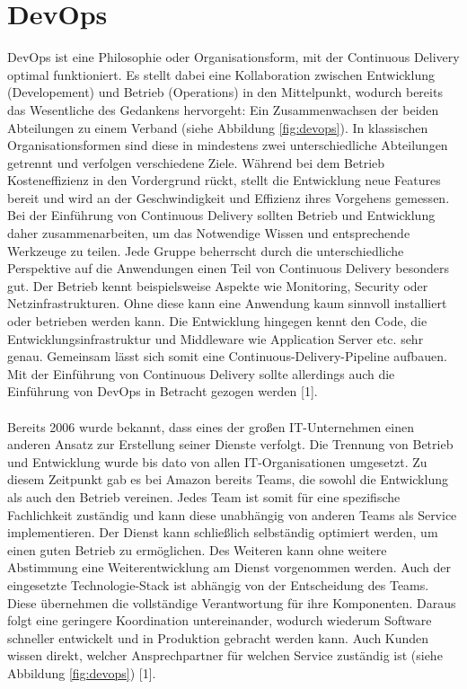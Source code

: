 \section{DevOps}
DevOps ist eine Philosophie oder Organisationsform, mit der Continuous Delivery optimal funktioniert. Es stellt dabei eine Kollaboration zwischen Entwicklung (Developement) und Betrieb (Operations) in den Mittelpunkt, wodurch bereits das Wesentliche des Gedankens hervorgeht: Ein Zusammenwachsen der beiden Abteilungen zu einem Verband (siehe Abbildung \ref{fig:devops}). In klassischen Organisationsformen sind diese in mindestens zwei unterschiedliche Abteilungen getrennt und verfolgen verschiedene Ziele. Während bei dem Betrieb Kosteneffizienz in den Vordergrund rückt, stellt die Entwicklung neue Features bereit und wird an der Geschwindigkeit und Effizienz ihres Vorgehens gemessen. Bei der Einführung von Continuous Delivery sollten Betrieb und Entwicklung daher zusammenarbeiten, um das Notwendige Wissen und entsprechende Werkzeuge zu teilen. Jede Gruppe beherrscht durch die unterschiedliche Perspektive auf die Anwendungen einen Teil von Continuous Delivery besonders gut. Der Betrieb kennt beispielsweise Aspekte wie Monitoring, Security oder Netzinfrastrukturen. Ohne diese kann eine Anwendung kaum sinnvoll installiert oder betrieben werden kann. Die Entwicklung hingegen kennt den Code, die Entwicklungsinfrastruktur und Middleware wie Application Server etc. sehr genau. Gemeinsam lässt sich somit eine Continuous-Delivery-Pipeline aufbauen. Mit der Einführung von Continuous Delivery sollte allerdings auch die Einführung von DevOps in Betracht gezogen werden [1].\\ \\
Bereits 2006 wurde bekannt, dass eines der großen IT-Unternehmen einen anderen Ansatz zur Erstellung seiner Dienste verfolgt. Die Trennung von Betrieb und Entwicklung wurde bis dato von allen IT-Organisationen umgesetzt. Zu diesem Zeitpunkt gab es bei Amazon bereits Teams, die sowohl die Entwicklung als auch den Betrieb vereinen. Jedes Team ist somit für eine spezifische Fachlichkeit zuständig und kann diese unabhängig von anderen Teams als Service implementieren. Der Dienst kann schließlich selbständig optimiert werden, um einen guten Betrieb zu ermöglichen. Des Weiteren kann ohne weitere Abstimmung eine Weiterentwicklung am Dienst vorgenommen werden. Auch der eingesetzte Technologie-Stack ist abhängig von der Entscheidung des Teams. Diese übernehmen die vollständige Verantwortung für ihre Komponenten. Daraus folgt eine geringere Koordination untereinander, wodurch wiederum Software schneller entwickelt und in Produktion gebracht werden kann. Auch Kunden wissen direkt, welcher Ansprechpartner für welchen Service zuständig ist (siehe Abbildung \ref{fig:devops}) [1].\\ \\
